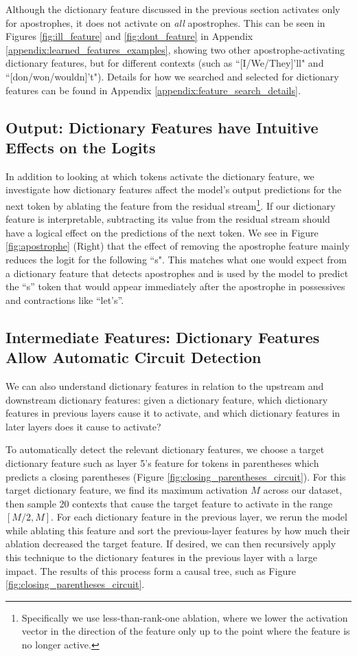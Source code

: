 Although the dictionary feature discussed in the previous section activates only for apostrophes, it does not activate on \emph{all} apostrophes. This can be seen in Figures \ref{fig:ill_feature} and \ref{fig:dont_feature} in Appendix \ref{appendix:learned_features_examples}, showing two other apostrophe-activating dictionary features, but for different contexts (such as ``[I/We/They]'ll" and ``[don/won/wouldn]'t"). Details for how we searched and selected for dictionary features can be found in Appendix \ref{appendix:feature_search_details}.


\subsection{Output: Dictionary Features have Intuitive Effects on the Logits}
In addition to looking at which tokens activate the dictionary feature, we investigate how dictionary features affect the model's output predictions for the next token by ablating the feature from the residual stream\footnote{Specifically we use less-than-rank-one ablation, where we lower the activation vector in the direction of the feature only up to the point where the feature is no longer active.}. If our dictionary feature is interpretable, subtracting its value from the residual stream should have a logical effect on the predictions of the next token. We see in Figure \ref{fig:apostrophe} (Right) that the effect of removing the apostrophe feature mainly reduces the logit for the following ``s". This matches what one would expect from a dictionary feature that detects apostrophes and is used by the model to predict the ``s'' token that would appear immediately after the apostrophe in possessives and contractions like ``let's''. 

\subsection{Intermediate Features: Dictionary Features Allow Automatic Circuit Detection}
We can also understand dictionary features in relation to the upstream and downstream dictionary features: given a dictionary feature, which dictionary features in previous layers cause it to activate, and which dictionary features in later layers does it cause to activate?

To automatically detect the relevant dictionary features, we choose a target dictionary feature such as layer 5's feature for tokens in parentheses which predicts a closing parentheses (Figure \ref{fig:closing_parentheses_circuit}). For this target dictionary feature, we find its maximum activation $M$ across our dataset, then sample 20 contexts that cause the target feature to activate in the range $[M/2, M]$. For each dictionary feature in the previous layer, we rerun the model while ablating this feature and sort the previous-layer features by how much their ablation decreased the target feature. If desired, we can then recursively apply this technique to the dictionary features in the previous layer with a large impact. The results of this process form a causal tree, such as Figure \ref{fig:closing_parentheses_circuit}. 

